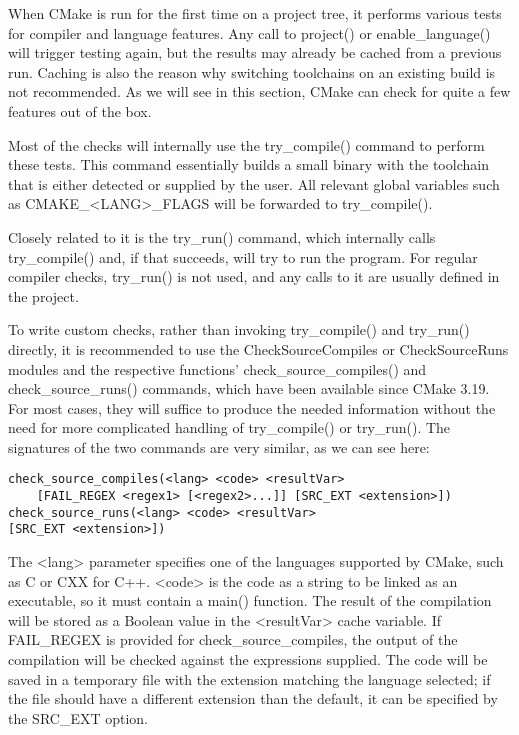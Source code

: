 
When CMake is run for the first time on a project tree, it performs various tests for compiler and language features. Any call to project() or enable\_language() will trigger testing again, but the results may already be cached from a previous run. Caching is also the reason why switching toolchains on an existing build is not recommended. As we will see in this section, CMake can check for quite a few features out of the box.

Most of the checks will internally use the try\_compile() command to perform these tests. This command essentially builds a small binary with the toolchain that is either detected or supplied by the user. All relevant global variables such as CMAKE\_<LANG>\_FLAGS will be forwarded to try\_compile().

Closely related to it is the try\_run() command, which internally calls try\_compile() and, if that succeeds, will try to run the program. For regular compiler checks, try\_run() is not used, and any calls to it are usually defined in the project.

To write custom checks, rather than invoking try\_compile() and try\_run() directly, it is recommended to use the CheckSourceCompiles or CheckSourceRuns modules and the respective functions' check\_source\_compiles() and check\_source\_runs() commands, which have been available since CMake 3.19. For most cases, they will suffice to produce the needed information without the need for more complicated handling of try\_compile() or try\_run(). The signatures of the two commands are very similar, as we can see here:

\begin{lstlisting}[style=styleCMake]
check_source_compiles(<lang> <code> <resultVar>
	[FAIL_REGEX <regex1> [<regex2>...]] [SRC_EXT <extension>])
check_source_runs(<lang> <code> <resultVar>
[SRC_EXT <extension>])
\end{lstlisting}

The <lang> parameter specifies one of the languages supported by CMake, such as C or CXX for C++. <code> is the code as a string to be linked as an executable, so it must contain a main() function. The result of the compilation will be stored as a Boolean value in the <resultVar> cache variable. If FAIL\_REGEX is provided for check\_source\_compiles, the output of the compilation will be checked against the expressions supplied. The code will be saved in a temporary file with the extension matching the language selected; if the file should have a different extension than the default, it can be specified by the SRC\_EXT option.

